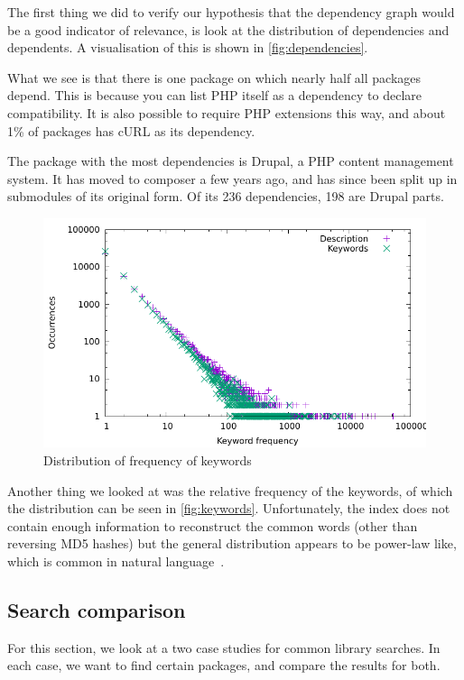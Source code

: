 \documentclass{article}
\begin{document}
The first thing we did to verify our hypothesis that the dependency graph would be a good indicator of relevance, is look at the distribution of dependencies and dependents. A visualisation of this is shown in \autoref{fig:dependencies}.

What we see is that there is one package on which nearly half all packages depend. This is because you can list PHP itself as a dependency to declare compatibility. It is also possible to require PHP extensions this way, and about 1\% of packages has cURL as its dependency.

The package with the most dependencies is Drupal, a PHP content management system. It has moved to composer a few years ago, and has since been split up in submodules of its original form. Of its 236 dependencies, 198 are Drupal parts.

\begin{figure}
	\centering
	\includegraphics[width=\textwidth]{keywords}
	\caption{Distribution of frequency of keywords}
	\label{fig:keywords}
\end{figure}

Another thing we looked at was the relative frequency of the keywords, of which the distribution can be seen in \autoref{fig:keywords}. Unfortunately, the index does not contain enough information to reconstruct the common words (other than reversing MD5 hashes) but the general distribution appears to be power-law like, which is common in natural language~\cite{zipf}.

\subsection{Search comparison}

For this section, we look at a two case studies for common library searches. In each case, we want to find certain packages, and compare the results for both.
\end{document}
